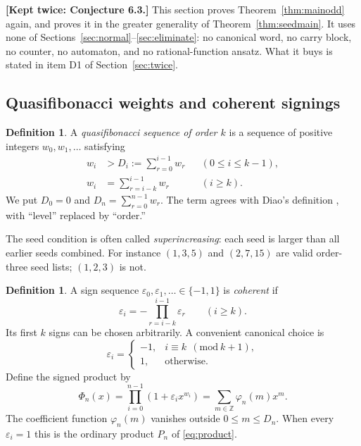 \documentclass[11pt,letterpaper]{article}
\numberwithin{equation}{section}
\theoremstyle{definition}
\newtheorem{definition}[theorem]{Definition}
\theoremstyle{remark}
\newcommand{\Z}{\mathbb Z}
\newcommand{\eps}{\varepsilon}
\begin{document}
\noindent\textbf{[Kept twice: Conjecture 6.3.]}
This section proves Theorem~\ref{thm:mainodd} again, and proves it in the
greater generality of Theorem~\ref{thm:seedmain}. It uses none of
Sections~\ref{sec:normal}--\ref{sec:eliminate}: no canonical word, no
carry block, no counter, no automaton, and no rational-function ansatz.
What it buys is stated in item D1 of Section~\ref{sec:twice}.

\subsection{Quasifibonacci weights and coherent signings}

\begin{definition}
\label{def:weights}
A \emph{quasifibonacci sequence of order $k$} is a sequence of positive
integers $w_0,w_1,\ldots$ satisfying
\begin{align}
 w_i&>D_i:=\sum_{r=0}^{i-1}w_r &&(0\le i\le k-1),\label{eq:seed}\\
 w_i&=\sum_{r=i-k}^{i-1}w_r &&(i\ge k).\label{eq:recw}
\end{align}
We put $D_0=0$ and $D_n=\sum_{r=0}^{n-1}w_r$.
The term agrees with Diao's definition \cite[Definition~1.1]{Diao}, with
``level'' replaced by ``order.''
\end{definition}

The seed condition is often called \emph{superincreasing}: each seed is
larger than all earlier seeds combined. For instance $(1,3,5)$ and
$(2,7,15)$ are valid order-three seed lists; $(1,2,3)$ is not.

\begin{definition}
\label{def:sign}
A sign sequence $\eps_0,\eps_1,\ldots\in\{-1,1\}$ is \emph{coherent} if
\begin{equation}
 \eps_i=-\prod_{r=i-k}^{i-1}\eps_r\qquad(i\ge k).
 \label{eq:signrec}
\end{equation}
Its first $k$ signs can be chosen arbitrarily. A convenient canonical choice
is
\begin{equation}
 \eps_i=\begin{cases}-1,&i\equiv k\ \ (\mathrm{mod}\ k+1),\\
 1,&\text{otherwise.}\end{cases}
 \label{eq:canonical}
\end{equation}
Define the signed product by
\[
 \Phi_n(x)=\prod_{i=0}^{n-1}(1+\eps_i x^{w_i})=\sum_{m\in\Z}\varphi_n(m)x^m .
\]
The coefficient function $\varphi_n(m)$ vanishes outside $0\le m\le D_n$.
When every $\eps_i=1$ this is the ordinary product $P_n$ of
\eqref{eq:product}.
\end{definition}
\end{document}
